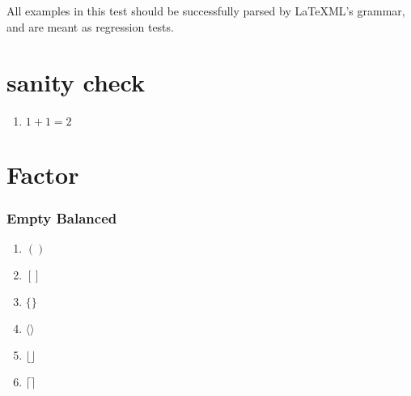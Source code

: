 \documentclass{article}
\begin{document}
All examples in this test should be successfully parsed by LaTeXML's grammar, and are meant as regression tests.

\section{sanity check}
\begin{enumerate}
\item $1+1=2$
\end{enumerate}

\section{Factor}
\subsubsection{Empty Balanced}
\begin{enumerate}
  \item $()$
  \item $[]$
  \item $\{\}$
  \item $\langle\rangle$
  \item $\lfloor\rfloor$
  \item $\lceil\rceil$
\end{enumerate}
\end{document}
